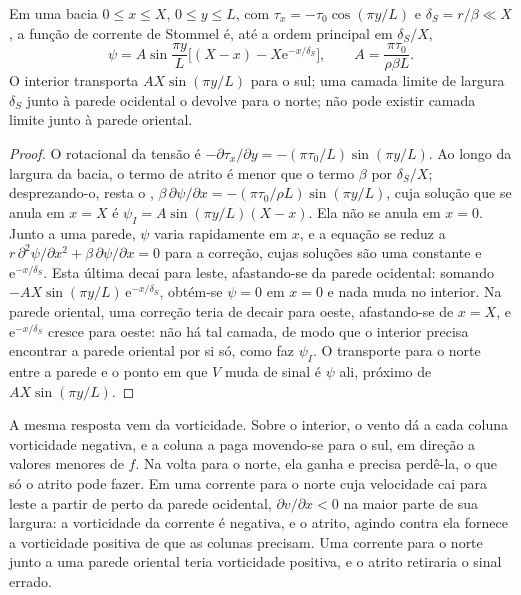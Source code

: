 \begin{theorem}\label{thm:b3:ocean-dynamics:stommel}
Em uma bacia $0 \le x \le X$, $0 \le y \le L$, com $\tau_x = -\tau_0
\cos(\pi y/L)$ e $\delta_S = r/\beta \ll X$, a função de corrente de Stommel
é, até a ordem principal em $\delta_S/X$,
\[
\psi = A\sin\frac{\pi y}{L}\Big[(X - x) - X\mathrm e^{-x/\delta_S}\Big],
\qquad A = \frac{\pi\tau_0}{\rho\beta L} .
\]
O interior transporta $AX\sin(\pi y/L)$ para o sul; uma camada limite de largura
$\delta_S$ junto à parede ocidental o devolve para o norte; não pode existir
camada limite junto à parede oriental.
\end{theorem}

\begin{proof}
O rotacional da tensão é $-\partial\tau_x/\partial y = -(\pi\tau_0/L)\sin(\pi
y/L)$. Ao longo da largura da bacia, o termo de atrito é menor que o termo
$\beta$ por $\delta_S/X$; desprezando-o, resta o ,
$\beta\,\partial\psi/\partial x = -(\pi\tau_0/\rho L)\sin(\pi y/L)$, cuja
solução que se anula em $x = X$ é $\psi_I = A\sin(\pi y/L)(X - x)$. Ela não
se anula em $x = 0$. Junto a uma parede, $\psi$ varia rapidamente em $x$, e a
equação se reduz a $r\,\partial^2\psi/\partial x^2 + \beta\,\partial\psi/
\partial x = 0$ para a correção, cujas soluções são uma constante e
$\mathrm e^{-x/\delta_S}$. Esta última decai para leste, afastando-se da
parede ocidental: somando $-AX\sin(\pi y/L)\,\mathrm e^{-x/\delta_S}$, obtém-se $\psi = 0$
em $x = 0$ e nada muda no interior. Na parede oriental, uma
correção teria de decair para oeste, afastando-se de $x = X$, e
$\mathrm e^{-x/\delta_S}$ cresce para oeste: não há tal camada, de modo que o
interior precisa encontrar a parede oriental por si só, como faz $\psi_I$. O
transporte para o norte entre a parede e o ponto em que $V$ muda de sinal
é $\psi$ ali, próximo de $AX\sin(\pi y/L)$.
\end{proof}

A mesma resposta vem da vorticidade. Sobre o interior, o vento dá a
cada coluna vorticidade negativa, e a coluna a paga movendo-se
para o sul, em direção a valores menores de $f$. Na volta para o norte, ela ganha 
e precisa perdê-la, o que só o atrito pode fazer. Em uma corrente para o norte
cuja velocidade cai para leste a partir de perto da parede ocidental, $\partial
v/\partial x < 0$ na maior parte de sua largura: a vorticidade da corrente é negativa, e o atrito, agindo contra
ela fornece a vorticidade positiva de que as colunas precisam. Uma corrente para o norte
junto a uma parede oriental teria vorticidade positiva, e
o atrito retiraria o sinal errado.

